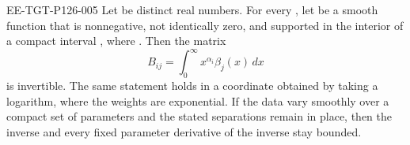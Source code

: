 \begin{lemma}\label{lem:A.1}
\begin{EESegment}{EE-TGT-P126-005}
Let  be distinct real numbers. For every
, let  be a smooth function that is
nonnegative, not identically zero, and supported in the interior of a compact interval
, where
. Then the matrix
\[
  B_{ij}=\int_0^\infty x^{\alpha_i}\beta_j(x)\,dx
\]
is invertible. The same statement holds in a coordinate obtained by taking a logarithm,
where the weights are exponential. If the data vary smoothly over a compact set of parameters and the stated
separations remain in place, then the inverse and every fixed parameter derivative of the
inverse stay bounded.
\end{EESegment}
\end{lemma}
